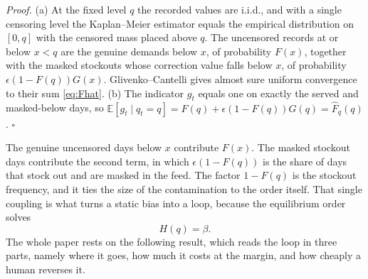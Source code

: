 \documentclass[11pt]{article}
\theoremstyle{plain}
\begin{document}
\noindent\textit{Proof.}
(a) At the fixed level $q$ the recorded values are i.i.d., and with a single
censoring level the Kaplan--Meier estimator equals the empirical distribution on
$[0,q]$ with the censored mass placed above $q$. The uncensored records at or below
$x<q$ are the genuine demands below $x$, of probability $F(x)$, together with the
masked stockouts whose correction value falls below $x$, of probability
$\epsilon(1-F(q))G(x)$. Glivenko--Cantelli gives almost sure uniform convergence to
their sum \eqref{eq:Fhat}. (b) The indicator $g_t$ equals one on exactly the served
and masked-below days, so
$\mathbb E[g_t\mid q_t=q]=F(q)+\epsilon(1-F(q))G(q)=\widehat F_q(q)$. \hfill$\square$

The genuine uncensored days below $x$ contribute $F(x)$. The masked stockout
days contribute the second term, in which $\epsilon(1-F(q))$ is the share of days
that stock out and are masked in the feed. The factor $1-F(q)$ is the stockout
frequency,
and it ties the size of the contamination to the order itself. That single coupling
is what turns a static bias into a loop, because the equilibrium order solves
\begin{equation}\label{eq:fp}
  H(q)=\beta .
\end{equation}
The whole paper rests on the following result, which reads the loop in three parts,
namely where it goes, how much it costs at the margin, and how cheaply a human
reverses it.
\end{document}
